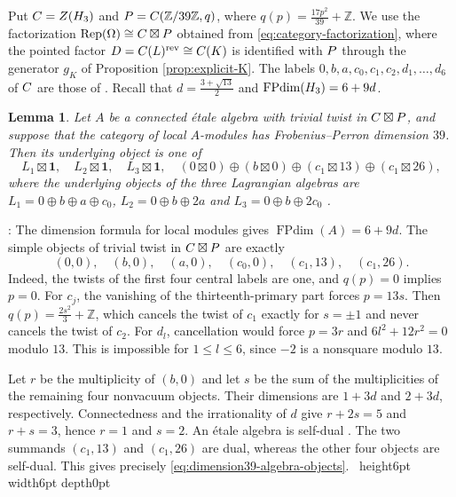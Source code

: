 \documentclass[leqno]{article}
\let\cal\relax
\newcommand{\cal}{\mathcal}
\newcommand{\Z}{\ensuremath{\mathbb{Z}}}
\renewcommand{\leq}{\ensuremath{\leqslant}}
\newcommand{\qed}{\hfill \vrule height6pt  width6pt depth0pt}
\DeclareMathOperator{\Rep}{Rep}
\newtheorem{lemma}[thm]{Lemma}
\newenvironment{proof}[1][]{\noindent {\it Proof #1} : }{\hbox{~}\qed
\smallskip
}
\numberwithin{equation}{section}
\begin{document}
Put $\cal C = Z(\cal H_3)$ and $\cal P = \cal C(\Z/39\Z,q)$, where $q(p) = \frac{17p^2}{39}+\Z$. We use the factorization $\Rep(\Omega) \cong \cal C \boxtimes \cal P$ obtained from \eqref{eq:category-factorization}, where the pointed factor $\cal D = \cal C(L)^{\mathrm{rev}} \cong \cal C(K)$ is identified with $\cal P$ through the generator $g_K$ of Proposition \ref{prop:explicit-K}. The labels $0,b,a,c_0,c_1,c_2,d_1,\ldots,d_6$ of $\cal C$ are those of \cite[Section 2]{Arh26a}. Recall that $d = \frac{3+\sqrt{13}}{2}$ and $\operatorname{FPdim}(\cal H_3) = 6+9d$.

\begin{lemma}
\label{lem:dimension39-algebra-objects}
Let $A$ be a connected \'etale algebra with trivial twist in $\cal C \boxtimes \cal P$, and suppose that the category of local $A$-modules has Frobenius--Perron dimension $39$. Then its underlying object is one of
\begin{equation}
\label{eq:dimension39-algebra-objects}
L_1 \boxtimes \mathbf 1,\quad L_2 \boxtimes \mathbf 1,\quad L_3 \boxtimes \mathbf 1,\quad
(0\boxtimes 0)\oplus(b\boxtimes 0)\oplus(c_1\boxtimes 13)\oplus(c_1\boxtimes 26),
\end{equation}
where the underlying objects of the three Lagrangian algebras are $L_1 = 0\oplus b\oplus a\oplus c_0$, $L_2 = 0\oplus b\oplus 2a$ and $L_3 = 0\oplus b\oplus 2c_0$ \cite[Corollary 3.8 p.~18]{Arh26b}.
\end{lemma}

\begin{proof}
The dimension formula for local modules \cite[Corollary 3.32 p.~15]{DMNO13} gives $\operatorname{FPdim}(A) = 6+9d$. The simple objects of trivial twist in $\cal C\boxtimes\cal P$ are exactly
\[
(0,0),\quad(b,0),\quad(a,0),\quad(c_0,0),\quad(c_1,13),\quad(c_1,26).
\]
Indeed, the twists of the first four central labels are one, and $q(p) = 0$ implies $p = 0$. For $c_j$, the vanishing of the thirteenth-primary part forces $p = 13s$. Then $q(p) = \frac{2s^2}{3}+\Z$, which cancels the twist of $c_1$ exactly for $s = \pm1$ and never cancels the twist of $c_2$. For $d_l$, cancellation would force $p = 3r$ and $6l^2+12r^2 = 0$ modulo $13$. This is impossible for $1 \leq l \leq 6$, since $-2$ is a nonsquare modulo $13$.

Let $r$ be the multiplicity of $(b,0)$ and let $s$ be the sum of the multiplicities of the remaining four nonvacuum objects. Their dimensions are $1+3d$ and $2+3d$, respectively. Connectedness and the irrationality of $d$ give $r+2s = 5$ and $r+s = 3$, hence $r = 1$ and $s = 2$. An \'etale algebra is self-dual \cite[Remark 3.4 p.~7]{DMNO13}. The two summands $(c_1,13)$ and $(c_1,26)$ are dual, whereas the other four objects are self-dual. This gives precisely \eqref{eq:dimension39-algebra-objects}.
\end{proof}
\end{document}
